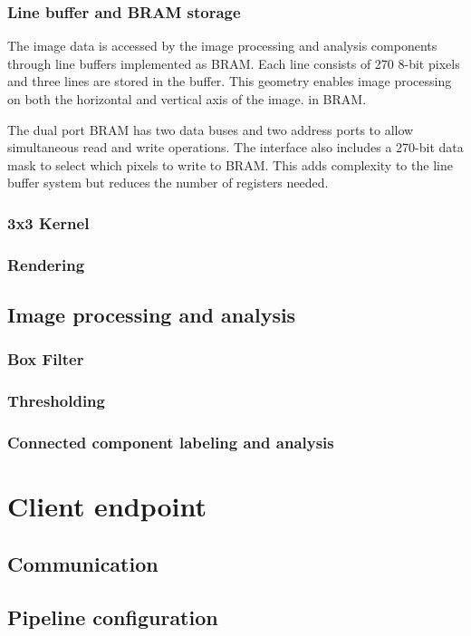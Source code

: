 \documentclass[12pt]{report}
\begin{document}
\subsubsection{Line buffer and BRAM storage}
The image data is accessed by the image processing and analysis components through line buffers implemented as BRAM. Each line consists of 270 8-bit pixels and three lines are stored in the buffer. This geometry enables image processing on both the horizontal and vertical axis of the image. in BRAM.
\par
The dual port BRAM has two data buses and two address ports to allow simultaneous read and write operations. The interface also includes a 270-bit data mask to select which pixels to write to BRAM. This adds complexity to the line buffer system but reduces the number of registers needed.  
\subsubsection{3x3 Kernel}

\subsubsection{Rendering}

\subsection{Image processing and analysis}
\subsubsection{Box Filter}
\subsubsection{Thresholding}
\subsubsection{Connected component labeling and analysis}

\section{Client endpoint}
\subsection{Communication}
\subsection{Pipeline configuration}
\end{document}
